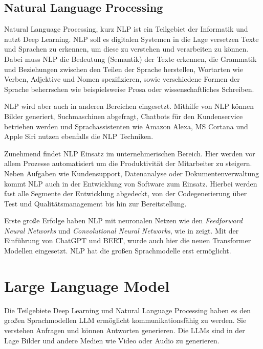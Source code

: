 \subsection{Natural Language Processing}
Natural Language Processing, kurz \acrshort{NLP} ist ein Teilgebiet der Informatik und nutzt Deep Learning. NLP soll es digitalen Systemen in die Lage versetzen Texte und Sprachen zu erkennen, um diese zu verstehen und verarbeiten zu können. Dabei muss NLP die Bedeutung (Semantik) der Texte erkennen, die Grammatik und Beziehungen zwischen den Teilen der Sprache herstellen, Wortarten wie Verben, Adjektive und Nomen spezifizieren, sowie verschiedene Formen der Sprache beherrschen wie beispielsweise Prosa oder wissenschaftliches Schreiben.\vspace{0.2cm}

NLP wird aber auch in anderen Bereichen eingesetzt. Mithilfe von NLP können Bilder generiert, Suchmaschinen abgefragt, Chatbots für den Kundenservice betrieben werden und Sprachassistenten wie Amazon Alexa, MS Cortana und Apple Siri nutzen ebenfalls die NLP Techniken.\vspace{0.2cm}

Zunehmend findet NLP Einsatz im unternehmerischen Bereich. Hier werden vor allem Prozesse automatisiert um die Produktivität der Mitarbeiter zu steigern. Neben Aufgaben wie Kundensupport, Datenanalyse oder Dokumentenverwaltung kommt NLP auch in der Entwicklung von Software zum Einsatz. Hierbei werden fast alle Segmente der Entwicklung abgedeckt, von der Codegenerierung über Test und Qualitätsmanagement bis hin zur Bereitstellung.\vspace{0.2cm}

Erste große Erfolge haben NLP mit neuronalen Netzen wie den \textit{Feedforward Neural Networks} und \textit{Convolutional Neural Networks}, wie in \cite{goldberg-2016} zeigt. Mit der Einführung von ChatGPT und BERT, wurde auch hier die neuen Transformer Modellen eingesetzt. NLP hat die großen Sprachmodelle erst ermöglicht.


\section{Large Language Model}
Die Teilgebiete Deep Learning und Natural Language Processing haben es den großen Sprachmodellen \acrshort{LLM} ermöglicht kommunikationsfähig zu werden. Sie verstehen Anfragen und können Antworten generieren. Die LLMs sind in der Lage Bilder und andere Medien wie Video oder Audio zu generieren.\vspace{0.2cm}

